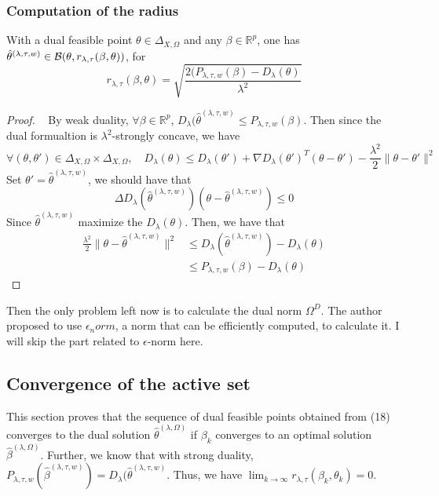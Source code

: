 \documentclass{article}
\def\real{\mathbb{R}}
\def\cb{{\cal B}}
\begin{document}
\subsubsection{Computation of the radius}
With a dual feasible point $\theta \in \Delta_{X,\Omega}$ and any $\beta \in \real^p$, one has $\hat{\theta}^{(\lambda,\tau,w)} \in \cb(\theta,r_{\lambda,\tau}(\beta,\theta))$, for 
$$
r_{\lambda,\tau}(\beta,\theta) = \sqrt{\frac{2(P_{\lambda,\tau,w}(\beta) - D_{\lambda}(\theta)}{\lambda^2}}
$$
\begin{proof} ~\newline
By weak duality, $\forall \beta \in \real^p$, $D_{\lambda}(\hat{\theta}^{(\lambda,\tau,w)} \leq P_{\lambda,\tau,w}(\beta)$. Then since the dual formualtion is $\lambda^2$-strongly concave, we have 
$$
\forall (\theta,\theta') \in \Delta_{X,\Omega} \times \Delta_{X,\Omega}, \quad D_{\lambda}(\theta) \leq D_{\lambda}(\theta') + \nabla D_{\lambda}(\theta')^T (\theta - \theta') - \frac{\lambda^2}{2}\|\theta - \theta'\|^2
$$
Set $\theta' = \hat{\theta}^{(\lambda,\tau,w)}$, we should have that 
$$
\Delta D_{\lambda}( \hat{\theta}^{(\lambda,\tau,w)})(\theta -  \hat{\theta}^{(\lambda,\tau,w)}) \leq 0
$$
Since $\hat{\theta}^{(\lambda,\tau,w)}$ maximize the $D_{\lambda}(\theta)$. Then, we have that 
\begin{align}
\frac{\lambda^2}{2}\|\theta -  \hat{\theta}^{(\lambda,\tau,w)}\|^2 &\leq D_{\lambda}(\hat{\theta}^{(\lambda,\tau,w)}) - D_{\lambda}(\theta) \\
& \leq P_{\lambda,\tau,w}(\beta) - D_{\lambda}(\theta)
\end{align}
\end{proof}

Then the only problem left now is to calculate the dual norm $\Omega^D$. The author proposed to use $\epsilon_norm$, a norm that can be efficiently computed, to calculate it.  I will skip the part related to $\epsilon$-norm here. 

\subsection{Convergence of the active set}
This section proves that the sequence of dual feasible points obtained from (18) converges to the dual solution $\hat{\theta}^{(\lambda,\Omega)}$ if $\beta_k$ converges to an optimal solution $\hat{\beta}^{(\lambda,\Omega)}$.  Further, we know that with strong duality, $P_{\lambda,\tau,w}(\hat{\beta}^{(\lambda,\tau,w)}) = D_{\lambda}(\hat{\theta}^{(\lambda,\tau,w)}$. Thus, we have $\lim_{k \to \infty} r_{\lambda,\tau}(\beta_k,\theta_k) = 0$.
\end{document}
